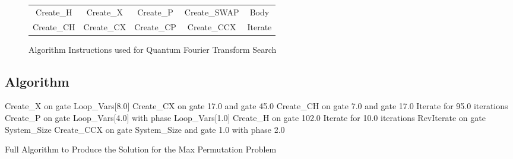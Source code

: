 \begin{figure}[h!]
\begin{center}
 \begin{tabular}{|ccccc|}
\hline
  Create\_H & Create\_X & Create\_P & Create\_SWAP & Body \\
  Create\_CH & Create\_CX & Create\_CP & Create\_CCX & Iterate \\
\hline
 \end{tabular}
\end{center}
\caption{Algorithm Instructions used for Quantum Fourier Transform Search}
\label{fig:qftgates}
\end{figure}

\subsection{Algorithm}
\begin{algorithm}
 \begin{algorithmic}
\STATE Create\_X on gate Loop\_Vars[8.0]
\STATE Create\_CX on gate 17.0 and gate 45.0
\STATE Create\_CH on gate 7.0 and gate 17.0
\STATE Iterate for 95.0 iterations {
\STATE Create\_P on gate Loop\_Vars[4.0] with phase Loop\_Vars[1.0]
\STATE }
\STATE Create\_H on gate 102.0
\STATE Iterate for 10.0 iterations {
\STATE }
\STATE RevIterate on gate System\_Size
\STATE Create\_CCX on gate System\_Size and gate 1.0 with phase 2.0
 \end{algorithmic}
\caption{Full Algorithm to Produce the Solution for the Max Permutation Problem}
\label{alg:03permfullalg}
\end{algorithm}

